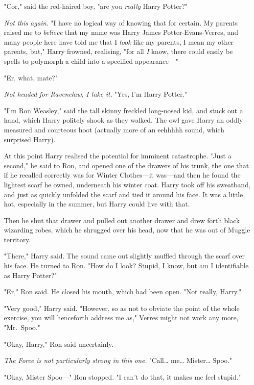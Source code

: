 "Cor," said the red-haired boy, "are you \emph{really} Harry Potter?"

\emph{Not this again.} "I have no logical way of knowing that for certain. My
parents raised me to \emph{believe} that my name was Harry James
Potter-Evans-Verres, and many people here have told me that I \emph{look} like
my parents, I mean my other parents, but," Harry frowned, realising, "for all
\emph{I} know, there could easily be spells to polymorph a child into a
specified appearance---"

"Er, what, mate?"

\emph{Not headed for Ravenclaw, I take it.} "Yes, I'm Harry Potter."

"I'm Ron Weasley," said the tall skinny freckled long-nosed kid, and stuck out
a hand, which Harry politely shook as they walked. The owl gave Harry an oddly
measured and courteous hoot (actually more of an eehhhhh sound, which surprised
Harry).

At this point Harry realised the potential for imminent catastrophe. "Just a
second," he said to Ron, and opened one of the drawers of his trunk, the one
that if he recalled correctly was for Winter Clothes---it was---and then he
found the lightest scarf he owned, underneath his winter coat. Harry took off
his sweatband, and just as quickly unfolded the scarf and tied it around his
face. It was a little hot, especially in the summer, but Harry could live with
that.

Then he shut that drawer and pulled out another drawer and drew forth black
wizarding robes, which he shrugged over his head, now that he was out of Muggle
territory.

"There," Harry said. The sound came out slightly muffled through the scarf over
his face. He turned to Ron. "How do I look? Stupid, I know, but am I
identifiable as Harry Potter?"

"Er," Ron said. He closed his mouth, which had been open. "Not really, Harry."

"Very good," Harry said. "However, so as not to obviate the point of the whole
exercise, you will henceforth address me as," Verres might not work any more,
"Mr.~Spoo."

"Okay, Harry," Ron said uncertainly.

\emph{The Force is not particularly strong in this one.} "Call{\ldots}
me{\ldots} Mister{\ldots} Spoo."

"Okay, Mister Spoo---" Ron stopped. "I can't do that, it makes me feel stupid."


